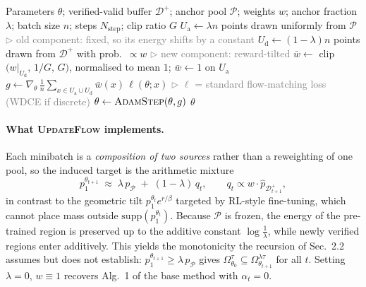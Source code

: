 \documentclass[a4paper]{article}
\newcommand{\Dbuf}{\mathcal{D}}                        %
\newcommand{\Anch}{\mathcal{P}}                        %
\newcommand{\UpdateFlow}{\textsc{UpdateFlow}}
\newcommand{\algcomment}[1]{\hfill\textcolor{gray}{$\triangleright$ \small #1}}
\begin{document}
\begin{algorithm}[t]
\caption{\UpdateFlow: arithmetic-mixture replay}
\label{alg:updateflow}
\begin{algorithmic}[1]
\Require Parameters $\theta$; verified-valid buffer $\Dbuf^{+}$; anchor pool $\Anch$;
         weights $w$; anchor fraction $\lambda$; batch size $n$; steps $N_{\mathrm{step}}$;
         clip ratio $G$
  \State $U_{\mathrm{a}}\gets\lambda n$ points drawn uniformly from $\Anch$
         \algcomment{old component: fixed, so its energy shifts by a constant}
  \State $U_{\mathrm{d}}\gets(1-\lambda)n$ points drawn from $\Dbuf^{+}$ with prob.\ $\propto w$
         \algcomment{new component: reward-tilted}
  \State $\bar w\gets$ clip$\big(w|_{U_{\mathrm{d}}},\,1/G,\,G\big)$, normalised to mean $1$;
         \quad $\bar w\gets 1$ on $U_{\mathrm{a}}$
  \State $g\gets\nabla_\theta\,\frac{1}{n}\sum_{x\in U_{\mathrm{a}}\cup U_{\mathrm{d}}}\bar w(x)\,\ell(\theta;x)$
         \algcomment{$\ell$ = standard flow-matching loss (WDCE if discrete)}
  \State $\theta\gets\textsc{AdamStep}(\theta,g)$
\EndFor
\State \Return $\theta$
\end{algorithmic}
\end{algorithm}

\paragraph{What \UpdateFlow{} implements.}
Each minibatch is a \emph{composition of two sources} rather than a reweighting of one pool,
so the induced target is the arithmetic mixture
\[
  p^{\theta_{t+1}}_1 \;\approx\; \lambda\,p_{\Anch} \;+\; (1-\lambda)\,q_t ,
  \qquad q_t \propto w \cdot \hat p_{\Dbuf^{+}_{t+1}} ,
\]
in contrast to the geometric tilt $p^{\theta_t}_1 e^{r/\beta}$ targeted by RL-style
fine-tuning, which cannot place mass outside $\mathrm{supp}(p^{\theta_t}_1)$.
Because $\Anch$ is frozen, the energy of the pre-trained region is preserved up to the
additive constant $\log\frac{1}{\lambda}$, while newly verified regions enter additively.
This yields the monotonicity the recursion of Sec.~2.2 assumes but does not establish:
$p^{\theta_{t+1}}_1\ge\lambda\,p_{\Anch}$ gives
$\Omega^{\tau}_{\theta_0}\subseteq\Omega^{\lambda\tau}_{\theta_{t+1}}$ for all $t$.
Setting $\lambda=0$, $w\equiv1$ recovers Alg.~1 of the base method with $\alpha_t=0$.

\clearpage
\appendix
\end{document}
